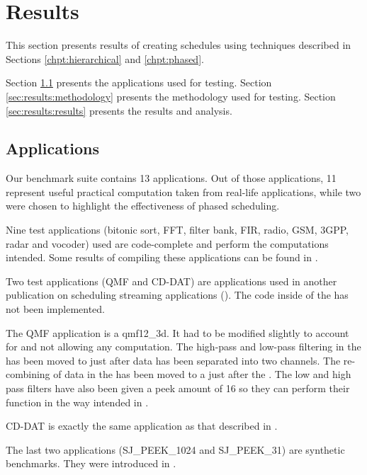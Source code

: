 \section{Results}
\label{chpt:results}

This section presents results of creating schedules using
techniques described in Sections \ref{chpt:hierarchical} and
\ref{chpt:phased}.

Section \ref{sec:results:apps} presents the applications used for
testing.  Section \ref{sec:results:methodology} presents the
methodology used for testing. Section \ref{sec:results:results}
presents the results and analysis.

\subsection{Applications}
\label{sec:results:apps}

Our benchmark suite contains 13 applications. Out of those
applications, 11 represent useful practical computation taken from
real-life applications, while two were chosen to highlight the
effectiveness of phased scheduling.

Nine test applications (bitonic sort, FFT, filter bank, FIR,
radio, GSM, 3GPP, radar and vocoder) used are code-complete and
perform the computations intended. Some results of compiling these
applications can be found in \cite{Gordo02}.

Two test applications (QMF and CD-DAT) are applications used in
another publication on scheduling streaming applications
(\cite{murthy99buffer}). The code inside of the {\filters} has not
been implemented.

The QMF application is a qmf12\_3d.  It had to be modified
slightly to account for {\StreamIt} {\splitters} and {\joiners}
not allowing any computation. The high-pass and low-pass filtering
in the {\splitters} has been moved to just after data has been
separated into two channels. The re-combining of data in the
{\joiners} has been moved to a {\filter} just after the
{\joiners}. The low and high pass filters have also been given a
peek amount of 16 so they can perform their function in the way
intended in {\StreamIt}.

CD-DAT is exactly the same application as that described in
\cite{murthy99buffer}.

The last two applications (SJ\_PEEK\_1024 and SJ\_PEEK\_31) are
synthetic benchmarks. They were introduced in
\cite{karczma-thesis}.

